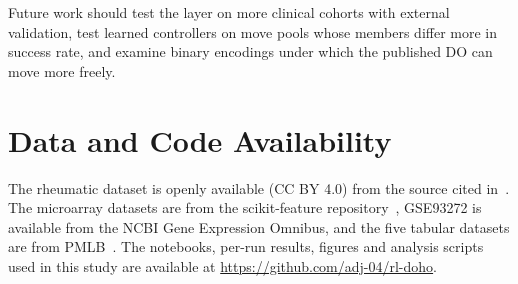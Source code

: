 \documentclass[journal]{IEEEtran}
\begin{document}
Future work should test the layer on more clinical cohorts with external validation, test learned controllers on move pools whose members differ more in success rate, and examine binary encodings under which the published DO can move more freely.

\section*{Data and Code Availability}
The rheumatic dataset is openly available (CC BY 4.0) from the source cited in~\cite{mahdi2025data}. The microarray datasets are from the scikit-feature repository~\cite{li2017fs}, GSE93272 is available from the NCBI Gene Expression Omnibus, and the five tabular datasets are from PMLB~\cite{olson2017pmlb}. The notebooks, per-run results, figures and analysis scripts used in this study are available at \url{https://github.com/adj-04/rl-doho}.
\end{document}
